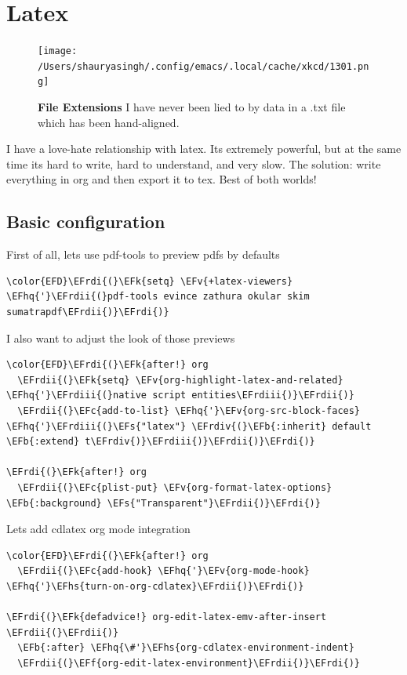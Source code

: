 \documentclass{scrartcl}
\newcommand{\EFk}[1]{\textcolor{EFk}{#1}} %
\newcommand{\EFs}[1]{\textcolor{EFs}{#1}} %
\newcommand{\EFb}[1]{\textcolor{EFb}{#1}} %
\newcommand{\EFc}[1]{\textcolor{EFc}{#1}} %
\newcommand{\EFv}[1]{\textcolor{EFv}{#1}} %
\newcommand{\EFf}[1]{\textcolor{EFf}{#1}} %
\newcommand{\EFhq}[1]{#1} %
\newcommand{\EFhs}[1]{#1} %
\newcommand{\EFrdi}[1]{#1} %
\newcommand{\EFrdii}[1]{#1} %
\newcommand{\EFrdiii}[1]{#1} %
\newcommand{\EFrdiv}[1]{#1} %
\begin{document}
\section{Latex}
\label{sec:org6725cf0}
\begin{figure}[!htb]
    \centering
    \texttt{[image: /Users/shauryasingh/.config/emacs/.local/cache/xkcd/1301.png]}
  \caption*{\label{xkcd:1301} \textbf{File Extensions} I have never been lied to by data in a .txt file which has been hand-aligned.}
  \end{figure}
I have a love-hate relationship with latex. Its extremely powerful, but at the
same time its hard to write, hard to understand, and very slow. The solution:
write everything in org and then export it to tex. Best of both worlds!

\subsection{Basic configuration}
\label{sec:org369e1f2}
First of all, lets use pdf-tools to preview pdfs by defaults
\begin{Code}
\begin{Verbatim}[]
\color{EFD}\EFrdi{(}\EFk{setq} \EFv{+latex-viewers} \EFhq{'}\EFrdii{(}pdf-tools evince zathura okular skim sumatrapdf\EFrdii{)}\EFrdi{)}
\end{Verbatim}
\end{Code}

I also want to adjust the look of those previews
\begin{Code}
\begin{Verbatim}[]
\color{EFD}\EFrdi{(}\EFk{after!} org
  \EFrdii{(}\EFk{setq} \EFv{org-highlight-latex-and-related} \EFhq{'}\EFrdiii{(}native script entities\EFrdiii{)}\EFrdii{)}
  \EFrdii{(}\EFc{add-to-list} \EFhq{'}\EFv{org-src-block-faces} \EFhq{'}\EFrdiii{(}\EFs{"latex"} \EFrdiv{(}\EFb{:inherit} default \EFb{:extend} t\EFrdiv{)}\EFrdiii{)}\EFrdii{)}\EFrdi{)}

\EFrdi{(}\EFk{after!} org
  \EFrdii{(}\EFc{plist-put} \EFv{org-format-latex-options} \EFb{:background} \EFs{"Transparent"}\EFrdii{)}\EFrdi{)}
\end{Verbatim}
\end{Code}

Lets add cdlatex org mode integration
\begin{Code}
\begin{Verbatim}[]
\color{EFD}\EFrdi{(}\EFk{after!} org
  \EFrdii{(}\EFc{add-hook} \EFhq{'}\EFv{org-mode-hook} \EFhq{'}\EFhs{turn-on-org-cdlatex}\EFrdii{)}\EFrdi{)}

\EFrdi{(}\EFk{defadvice!} org-edit-latex-emv-after-insert \EFrdii{(}\EFrdii{)}
  \EFb{:after} \EFhq{\#'}\EFhs{org-cdlatex-environment-indent}
  \EFrdii{(}\EFf{org-edit-latex-environment}\EFrdii{)}\EFrdi{)}
\end{Verbatim}
\end{Code}
\end{document}
